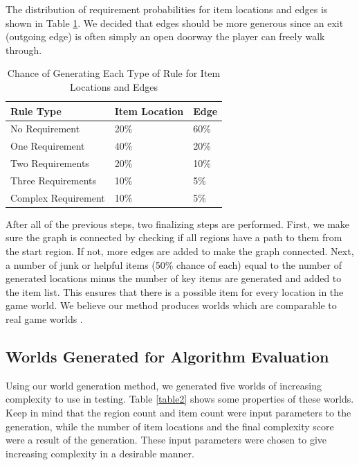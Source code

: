 \documentclass{ieeeaccess}
\begin{document}
The distribution of requirement probabilities for item locations and edges is shown in Table
\ref{table1}. We decided that edges should be more generous since an exit (outgoing edge) is
often simply an open doorway the player can freely walk through.

\begin{table}
\caption{Chance of Generating Each Type of Rule for Item Locations and Edges}
\label{table1}
\setlength{\tabcolsep}{3pt}
\renewcommand{\arraystretch}{1.2}
\begin{tabular}{ |p{100pt}|p{60pt}|p{60pt}|  }
 \hline
 Rule Type & Item Location & Edge \\
 \hline
 No Requirement & 20\% & 60\% \\
 \hline
 One Requirement & 40\% & 20\% \\
 \hline
 Two Requirements & 20\% & 10\% \\
 \hline
 Three Requirements & 10\% & 5\% \\
 \hline
 Complex Requirement & 10\% & 5\% \\
 \hline
\end{tabular}
\end{table}

After all of the previous steps, two finalizing steps are performed. First, we make sure the
graph is connected by checking if all regions have a path to them from the start region. If
not, more edges are added to make the graph connected. Next, a number of junk or helpful items
(50\% chance of each) equal to the number of generated locations minus the number of key items
are generated and added to the item list. This ensures that there is a possible item for every
location in the game world. We believe our method produces worlds which are comparable to 
real game worlds \cite{b1}.

\subsection{Worlds Generated for Algorithm Evaluation}
Using our world generation method, we generated five worlds of increasing complexity to use in
testing. Table \ref{table2} shows some properties of these worlds. Keep in mind that the region
count and item count were input parameters to the generation, while the number of item
locations and the final complexity score were a result of the generation. These input
parameters were chosen to give increasing complexity in a desirable manner.
\end{document}
